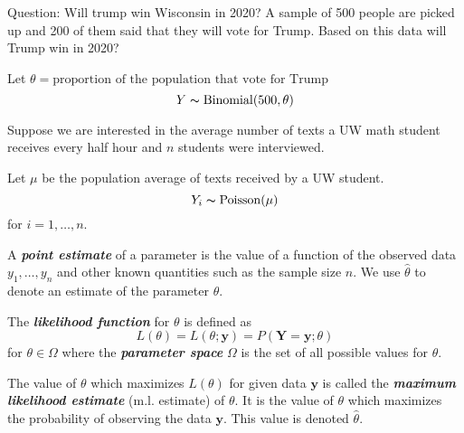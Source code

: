 \begin{exbox}
    \begin{example}
        Question: Will trump win Wisconsin in 2020? A sample of 500 people
        are picked up and 200 of them said that they will vote for Trump. Based
        on this data will Trump win in 2020?

        Let $ \theta=\text{proportion of the population that vote for Trump} $
        \[ Y \thicksim \operatorname{Binomial}(500,\theta) \]
    \end{example}
\end{exbox}

\begin{exbox}
    \begin{example}
        Suppose we are interested in the average number of texts a UW math student
        receives every half hour and $ n $ students were interviewed.

        Let $ \mu $ be the population average of texts received by a UW student.
        \[ Y_i \thicksim \operatorname{Poisson}(\mu) \]
        for $ i=1,\ldots ,n $.
    \end{example}
\end{exbox}

\begin{defbox}
    \begin{definition}
        A \textbf{\emph{point estimate}} of a parameter is the value of a function
        of the observed data $ y_1,\ldots ,y_n $ and other known quantities such as
        the sample size $ n $. We use $ \hat{\theta} $ to denote an estimate
        of the parameter $ \theta $.
    \end{definition}
\end{defbox}

\begin{defbox}
    \begin{definition}
        The \textbf{\emph{likelihood function}} for $ \theta $ is defined as
        \[ L(\theta)=L(\theta;\bm{y})=P(\bm{Y}=\bm{y}; \theta) \]
        for $ \theta\in\Omega $ where the \textbf{\emph{parameter space}} $ \Omega $
        is the set of all possible values for $ \theta $.
    \end{definition}
\end{defbox}

\begin{defbox}
    \begin{definition}
        The value of $ \theta $ which maximizes $ L(\theta) $ for given data $ \bm{y} $
        is called the \textbf{\emph{maximum likelihood estimate}} (m.l. estimate) of $ \theta $.
        It is the value of $ \theta $ which maximizes the probability of observing the data
        $ \bm{y} $. This value is denoted $ \hat{\theta} $.
    \end{definition}
\end{defbox}

